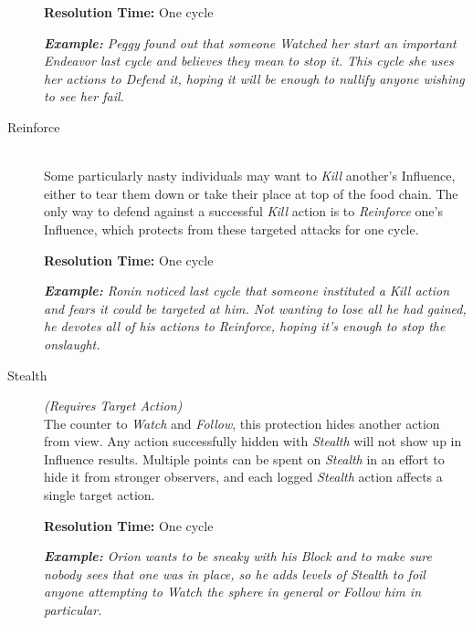 \begin{description}
		\textbf{Resolution Time:} One cycle
		
		\emph{\textbf{Example:} Peggy found out that someone \emph{Watched} her start an important 
		\emph{Endeavor} last cycle and believes they mean to stop it.  This cycle she uses her 
		actions to \emph{Defend} it, hoping it will be enough to nullify anyone wishing to see her fail.} \\
	
	\item[Reinforce] \hfill \\
		Some particularly nasty individuals may want to \emph{Kill} another's Influence, either to tear 
		them down or take their place at top of the food chain. The only way to defend against a successful 
		\emph{Kill} action is to \emph{Reinforce} one's Influence, which protects from these targeted attacks
		for one cycle.
		
		\textbf{Resolution Time:} One cycle
		
		\emph{\textbf{Example:} Ronin noticed last cycle that someone instituted a \emph{Kill} action and fears it 
		could be targeted at him.  Not wanting to lose all he had gained, he devotes all of his actions to 
		\emph{Reinforce}, hoping it's enough to stop the onslaught.} \\
	
	\item[Stealth] \emph{(Requires Target Action)} \hfill \\
		The counter to \emph{Watch} and \emph{Follow}, this protection hides another action from view.  Any 
		action successfully hidden with \emph{Stealth} will not show up in Influence results.  Multiple points 
		can be spent on \emph{Stealth} in an effort to hide it from stronger observers, and each logged 
		\emph{Stealth} action affects a single target action.
		
		\textbf{Resolution Time:} One cycle
		
		\emph{\textbf{Example:} Orion wants to be sneaky with his \emph{Block} and to make sure nobody sees that 
		one was in place, so he adds levels of \emph{Stealth} to foil anyone attempting to \emph{Watch} 
		the sphere in general or \emph{Follow} him in particular.} \\
\end{description}